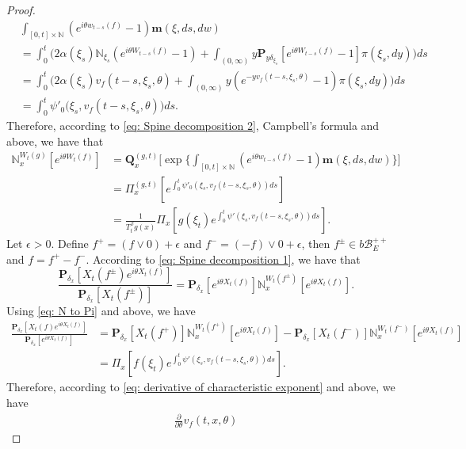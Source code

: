 \documentclass[12pt, a4paper]{amsart}
\theoremstyle{definition}
\numberwithin{equation}{section}
\begin{document}
\begin{proof}
\begin{align}
	&\int_{[0,t]\times \mathbb N}(e^{i\theta w_{t-s}(f)} - 1) \mathbf m(\xi, ds,dw)
	\\&=\int_0^t \Big(2\alpha(\xi_s)\mathbb N_{\xi_s}(e^{i\theta W_{t-s}(f)} - 1)  + \int_{(0,\infty)} y \mathbf P_{y \delta_{\xi_s}}[e^{i\theta W_{t-s}(f)} - 1] \pi(\xi_s,dy)\Big) ds
	\\&=\int_0^t \Big( 2\alpha(\xi_s) v_f(t-s,\xi_s,\theta) 
	+ \int_{(0,\infty)} y (e^{-y v_f(t-s,\xi_s,\theta)} - 1) \pi(\xi_s,dy) \Big) ds
	\\&= \int_0^t \psi'_0\big(\xi_s, v_f(t-s,\xi_s,\theta)\big)ds.
\end{align}
	Therefore, according to \eqref{eq: Spine decomposition 2}, Campbell's formula and above, we have that 
\begin{align}
\label{eq: N to Pi}
	\mathbb N_x^{W_t(g)}[e^{i\theta W_t(f)}]
	&=\mathbf Q_x^{(g,t)} \Big[\exp\Big\{\int_{[0,t]\times \mathbb N}(e^{i\theta w_{t-s}(f)} - 1) \mathbf m(\xi, ds,dw)\Big\}\Big]
	\\&= \Pi_x^{(g,t)} [e^{\int_0^t \psi'_0(\xi_s, v_f(t-s,\xi_s,\theta))ds}]
	\\&= \frac{1}{T_t^\beta g (x)} \Pi_x[ g(\xi_t) e^{\int_0^t \psi'(\xi_s, v_f(t-s,\xi_s,\theta))ds} ].
\end{align}
    Let $\epsilon >0$.
    Define $f^+ = (f \vee 0) + \epsilon$ and $f^- = (-f) \vee 0 + \epsilon$, then $f^\pm \in b\mathscr B^{++}_E$ and $f = f^+ - f^-$. 
    According to \eqref{eq: Spine decomposition 1}, we have that
\begin{equation}
    \frac{\mathbf P_{\delta_x}[X_t(f^{\pm})e^{i\theta X_t(f)}]}{\mathbf P_{\delta_x}[X_t(f^{\pm})]} 
    = \mathbf P_{\delta_x}[e^{i\theta X_t(f)}] \mathbb N_x^{W_t(f^{\pm})}[e^{i\theta X_t(f)}].
\end{equation}
    Using \eqref{eq: N to Pi} and above, we have
\begin{align}
	\frac{\mathbf P_{\delta_x}[X_t(f)e^{i\theta X_t(f)}] }{\mathbf P_{\delta_x}[e^{i\theta X_t(f)}]} 
	&= \mathbf P_{\delta_x}[X_t(f^+)] \mathbb N_x^{W_t(f^+)} [e^{i\theta X_t(f)}] - \mathbf P_{\delta_x}[X_t(f^-)]\mathbb N_x^{W_t(f^-)}[e^{i\theta X_t(f)}]
	\\& = \Pi_x[ f(\xi_t) e^{\int_0^t \psi'(\xi_s, v_f(t-s,\xi_s,\theta)) ds}  ].
\end{align}
	Therefore, according to \eqref{eq: derivative of characteristic exponent} and above, we have
\begin{align}
	\frac{\partial}{\partial \theta} v_f(t, x, \theta)

\end{align}
\end{proof}
\end{document}

